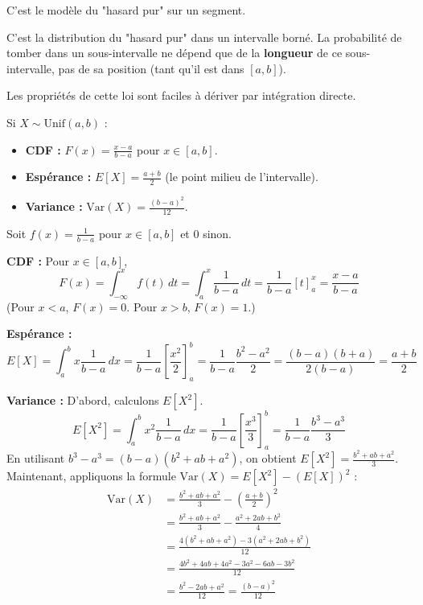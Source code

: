 C'est le modèle du "hasard pur" sur un segment.

\begin{intuitionbox}
C'est la distribution du "hasard pur" dans un intervalle borné. La probabilité de tomber dans un sous-intervalle ne dépend que de la \textbf{longueur} de ce sous-intervalle, pas de sa position (tant qu'il est dans $[a, b]$). 
\end{intuitionbox}

Les propriétés de cette loi sont faciles à dériver par intégration directe.

\begin{theorembox}
Si $X \sim \text{Unif}(a, b)$ :
\begin{itemize}
    \item \textbf{CDF :} $F(x) = \frac{x-a}{b-a}$ pour $x \in [a, b]$.
    \item \textbf{Espérance :} $E[X] = \frac{a+b}{2}$ (le point milieu de l'intervalle).
    \item \textbf{Variance :} $\text{Var}(X) = \frac{(b-a)^2}{12}$.
\end{itemize}
\end{theorembox}

\begin{proofbox}
Soit $f(x) = \frac{1}{b-a}$ pour $x \in [a, b]$ et $0$ sinon.

\textbf{CDF :} Pour $x \in [a, b]$,
$$ F(x) = \int_{-\infty}^x f(t) \, dt = \int_a^x \frac{1}{b-a} \, dt = \frac{1}{b-a} [t]_a^x = \frac{x-a}{b-a} $$
(Pour $x<a$, $F(x)=0$. Pour $x>b$, $F(x)=1$.)

\textbf{Espérance :}
$$ E[X] = \int_a^b x \frac{1}{b-a} \, dx = \frac{1}{b-a} \left[ \frac{x^2}{2} \right]_a^b = \frac{1}{b-a} \frac{b^2 - a^2}{2} = \frac{(b-a)(b+a)}{2(b-a)} = \frac{a+b}{2} $$

\textbf{Variance :} D'abord, calculons $E[X^2]$.
$$ E[X^2] = \int_a^b x^2 \frac{1}{b-a} \, dx = \frac{1}{b-a} \left[ \frac{x^3}{3} \right]_a^b = \frac{1}{b-a} \frac{b^3 - a^3}{3} $$
En utilisant $b^3 - a^3 = (b-a)(b^2 + ab + a^2)$, on obtient $E[X^2] = \frac{b^2 + ab + a^2}{3}$.
Maintenant, appliquons la formule $\text{Var}(X) = E[X^2] - (E[X])^2$ :
\begin{align*}
\text{Var}(X) &= \frac{b^2 + ab + a^2}{3} - \left(\frac{a+b}{2}\right)^2 \\
&= \frac{b^2 + ab + a^2}{3} - \frac{a^2 + 2ab + b^2}{4} \\
&= \frac{4(b^2 + ab + a^2) - 3(a^2 + 2ab + b^2)}{12} \\
&= \frac{4b^2 + 4ab + 4a^2 - 3a^2 - 6ab - 3b^2}{12} \\
&= \frac{b^2 - 2ab + a^2}{12} = \frac{(b-a)^2}{12}
\end{align*}
\end{proofbox}

